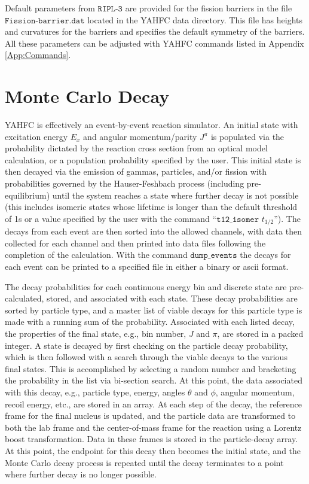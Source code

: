 \documentclass[
10pt,
showpacs,preprintnumbers,footinbib,
amsfonts,amsmath,amssymb,
aps,
prc,twocolumn,groupedaddress,superscriptaddress,
showkeys,
nofootinbib
]{revtex4-1}
\begin{document}
Default parameters from ${\texttt{RIPL-3}}$ are provided for the fission barriers in the file ${\texttt{Fission-barrier.dat}}$ located in the YAHFC data directory. This file has heights and curvatures for the barriers and specifies the default symmetry of the barriers. All these parameters can be adjusted with YAHFC commands listed in Appendix  \ref{App:Commands}.

\section{Monte Carlo Decay}

YAHFC is effectively an event-by-event reaction simulator. An initial state with excitation energy $E_x$ and angular momentum/parity $J^\pi$ is populated via the probability dictated by the reaction cross section from an optical model calculation, or a population probability specified by the user. This initial state is then decayed via the emission of gammas, particles, and/or fission with probabilities governed by the Hauser-Feshbach process (including pre-equilibrium) until the system reaches a state where further decay is not possible (this includes isomeric states whose lifetime is longer than the default threshold of 1s or a value  specified by the user with the command ``${\texttt{t12\_isomer }}t_{1/2}$''). The decays from each event are then sorted into the allowed channels, with data then collected for each channel and then printed into data files following the completion of the calculation. With the command ${\texttt{dump\_events}}$ the decays for each event can be printed to a specified file in either a binary or ascii format.  

The decay probabilities for each continuous energy bin and discrete state are pre-calculated, stored, and associated with each state. These decay probabilities are sorted by particle type, and a master list of viable decays for this particle type is made with a running sum of the probability. Associated with each listed decay, the properties of the final state, e.g., bin number, $J$ and $\pi$, are stored in a packed integer. A state is decayed by first checking on the particle decay probability, which is then followed with a search through the viable decays to the various final states. This is accomplished by selecting a random number and bracketing the probability in the list via bi-section search. At this point, the data associated with this decay, e.g., particle type, energy, angles $\theta$ and $\phi$, angular momentum, recoil energy, etc., are stored in an array. At each step of the decay, the reference frame for the final nucleus is updated, and the particle data are transformed to both the lab frame and the center-of-mass frame for the reaction using a Lorentz boost transformation. Data in these frames is stored in the particle-decay array. At this point, the endpoint for this decay then becomes the initial state, and the Monte Carlo decay process is repeated until the decay terminates to a point where further decay is no longer possible. 
\end{document}
